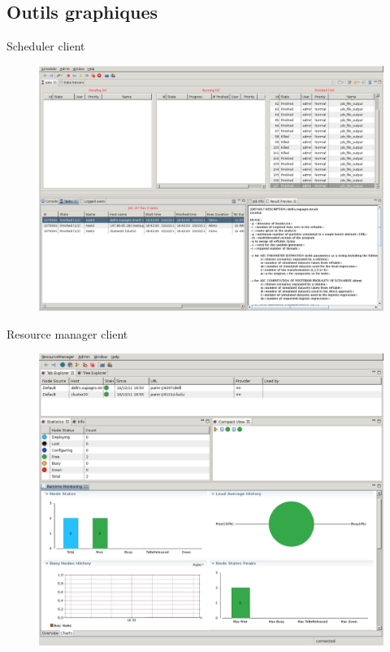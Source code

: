 \documentclass{beamer}
\begin{document}
\subsection{Outils graphiques}
\begin{frame}{Scheduler client}
    \begin{figure}
        \centering
        \includegraphics[scale=0.18]{sc_sched.png}
    \end{figure}
\end{frame}
\begin{frame}{Resource manager client}
    \begin{figure}
        \centering
        \includegraphics[scale=0.18]{sc_rmc.png}
    \end{figure}
\end{frame}
\end{document}
